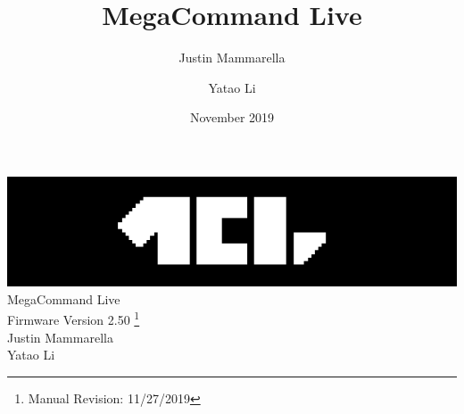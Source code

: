 \documentclass[openany,a4paper,12pt]{book}
\begin{document}
\author{
    Justin Mammarella
    \and
    Yatao Li
}
\title{MegaCommand Live}
\date{November 2019}

\frontmatter
\begin{titlepage}

	\begin{center}
	\vspace*{5.75cm}
	\includegraphics{mcl_logo_black_short.png}
    \vspace*{1.00cm}
	\LARGE
	\vspace*{0.65cm}
	\\MegaCommand Live
    \large
	\\Firmware Version 2.50
	\footnote{Manual Revision: 11/27/2019}
    \vspace*{2cm}
    \\Justin Mammarella
    \\Yatao Li
\end{center}
\end{titlepage}


\tableofcontents

\mainmatter











%

























\backmatter

\end{document}
